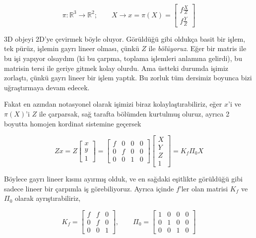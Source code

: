 \documentclass[12pt,fleqn]{article}\usepackage{../../common}
\begin{document}
$$ 
\pi: \mathbb{R}^3 \to \mathbb{R}^2; \qquad 
X \to x = \pi(X) =  \left[\begin{array}{l}
f \frac{X}{Z} \\ f \frac{Y}{Z}
\end{array}\right]
$$

3D objeyi 2D'ye çevirmek böyle oluyor. Görüldüğü gibi oldukça basit bir işlem,
tek pürüz, işlemin gayrı lineer olması, çünkü $Z$ ile {\em bölüyoruz}. Eğer bir
matris ile bu işi yapıyor olsaydım (ki bu çarpma, toplama işlemleri anlamına
gelirdi), bu matrisin tersi ile geriye gitmek kolay olurdu. Ama üstteki durumda
işimiz zorlaştı, çünkü gayrı lineer bir işlem yaptık. Bu zorluk tüm dersimiz
boyunca bizi uğraştırmaya devam edecek.

Fakat en azından notasyonel olarak işimizi biraz kolaylaştırabiliriz, eğer $x$'i
ve $\pi(X)$'i $Z$ ile çarparsak, sağ tarafta bölümden kurtulmuş oluruz, ayrıca 2
boyutta homojen kordinat sistemine geçersek

$$ 
Zx = Z \left[\begin{array}{r}
x \\ y \\ 1
\end{array}\right]  = 
\left[\begin{array}{rrrr}
f & 0 & 0 & 0 \\
0 & f & 0 & 0 \\
0 & 0 & 1 & 0
\end{array}\right]
\left[\begin{array}{r}
X \\ Y \\ Z \\ 1
\end{array}\right] = K_f \Pi_0 X
$$

Böylece gayrı lineer kısmı ayırmış olduk, ve en sağdaki eşitlikte görüldüğü gibi
sadece lineer bir çarpımla iş görebiliyoruz. Ayrıca içinde $f$'ler olan matrisi
$K_f$ ve $\Pi_0$ olarak ayrıştırabiliriz,

$$ K_f =
\left[\begin{array}{rrr}
f & f & 0 \\
0 & f & 0 \\
0 & 0 & 1
\end{array}\right], \qquad
\Pi_0 =
\left[\begin{array}{rrrr}
1 & 0 & 0 & 0\\
0 & 1 & 0 & 0\\
0 & 0 & 1 & 0
\end{array}\right]
 $$
\end{document}
